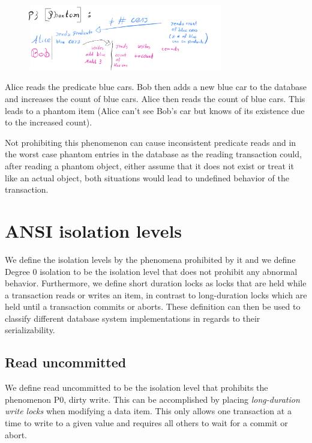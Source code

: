 \documentclass[sigconf, review=true]{acmart}
\begin{document}
\begin{figure}[h]
    
    \includegraphics[width=8.5cm]{P3}
    
\end{figure}

\begin{example}
    Alice reads the predicate blue cars. Bob then adds a new blue car to the database and increases
    the count of blue cars. Alice then reads the count of blue cars. This leads to a phantom item
    (Alice can’t see Bob's car but knows of its existence due to the increased count).
\end{example}
Not prohibiting this phenomenon can cause inconsistent predicate reads and in the worst case phantom entries in the
database as the reading transaction could, after reading a phantom object, either assume that it does not exist or treat it like an actual
object, both situations would lead to undefined behavior of the transaction.

\section{ANSI isolation levels}
We define the isolation levels by the phenomena prohibited by it and we define
Degree 0 isolation to be the isolation level that does not prohibit any abnormal
behavior. Furthermore, we define short duration locks as locks that are held
while a transaction reads or writes an item, in contrast to long-duration locks which are
held until a transaction commits or aborts.
These definition can then be used to classify different database system implementations in
regards to their serializability.

\subsection{Read uncommitted}
We define read uncommitted to be the isolation level that prohibits the phenomenon
P0, dirty write. This can be accomplished by placing \emph{long-duration write locks} when modifying a data item.
This only allows one transaction at a time to write to a given value and requires all others to wait for a commit or abort.
\end{document}
